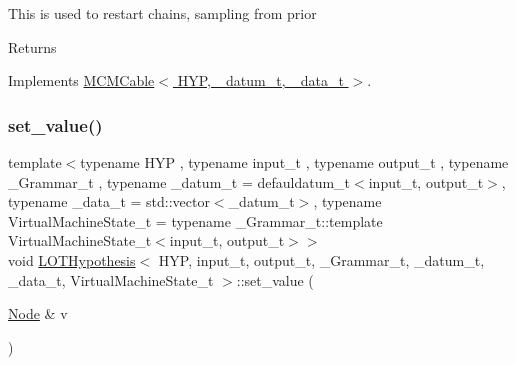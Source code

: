 This is used to restart chains, sampling from prior \begin{DoxyReturn}{Returns}

\end{DoxyReturn}


Implements \hyperlink{class_m_c_m_cable_a220d6c4ca73e20441c14fa5bd3e090d3}{M\+C\+M\+Cable$<$ H\+Y\+P, \+\_\+datum\+\_\+t, \+\_\+data\+\_\+t $>$}.

\mbox{\label{class_l_o_t_hypothesis_aac23de5143f24323a05ed32774387ff7}} 
\subsubsection{\texorpdfstring{set\+\_\+value()}{set\_value()}\hspace{0.1cm}{\footnotesize\ttfamily [1/2]}}
{\footnotesize\ttfamily template$<$typename H\+YP , typename input\+\_\+t , typename output\+\_\+t , typename \+\_\+\+Grammar\+\_\+t , typename \+\_\+datum\+\_\+t  = defauldatum\+\_\+t$<$input\+\_\+t, output\+\_\+t$>$, typename \+\_\+data\+\_\+t  = std\+::vector$<$\+\_\+datum\+\_\+t$>$, typename Virtual\+Machine\+State\+\_\+t  = typename \+\_\+\+Grammar\+\_\+t\+::template Virtual\+Machine\+State\+\_\+t$<$input\+\_\+t, output\+\_\+t$>$$>$ \\
void \hyperlink{class_l_o_t_hypothesis}{L\+O\+T\+Hypothesis}$<$ H\+YP, input\+\_\+t, output\+\_\+t, \+\_\+\+Grammar\+\_\+t, \+\_\+datum\+\_\+t, \+\_\+data\+\_\+t, Virtual\+Machine\+State\+\_\+t $>$\+::set\+\_\+value (\begin{DoxyParamCaption}\item[{\hyperlink{class_node}{Node} \&}]{v }\end{DoxyParamCaption})\hspace{0.3cm}{\ttfamily [inline]}}

\mbox{\label{class_l_o_t_hypothesis_a51a0d09f0f15a185d2b9a7efce48fc98}} 
